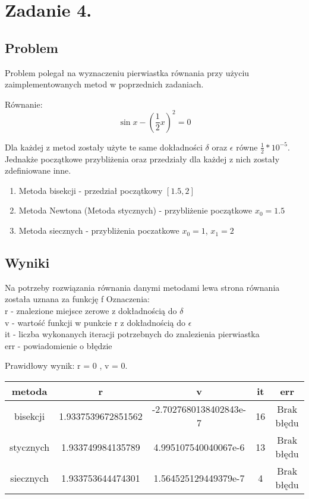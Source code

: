 \documentclass[11pt, a4paper]{article}
\begin{document}
    \section{Zadanie 4.}
    \subsection{Problem}
    Problem polegał na wyznaczeniu pierwiastka równania przy użyciu zaimplementowanych metod w poprzednich zadaniach.
    
    Równanie:
    \[\sin{x} - (\frac{1}{2}x)^{2} = 0 \]

    Dla każdej z metod zostały użyte te same dokładności $\delta$ oraz $\epsilon$ równe $\frac{1}{2} * 10^{-5}$.\\
    Jednakże początkowe przybliżenia oraz przedziały dla każdej z nich zostały zdefiniowane inne.
    \begin{enumerate}
        \item Metoda bisekcji - przedział początkowy $[1.5, 2]$
        \item Metoda Newtona (Metoda stycznych) - przybliżenie początkowe $x_{0} = 1.5$
        \item Metoda siecznych - przybliżenia poczatkowe $x_{0} = 1$, $x_{1} = 2$
    \end{enumerate}
    \subsection{Wyniki}
    Na potrzeby rozwiązania równania danymi metodami lewa strona równania została uznana za funkcję f
    Oznaczenia:\\
    r - znalezione miejsce zerowe z dokładnością do $\delta$ \\
    v - wartość funkcji w punkcie r z dokładnością do $\epsilon$ \\
    it - liczba wykonanych iteracji potrzebnych do znalezienia pierwiastka \\
    err - powiadomienie o błędzie

    Prawidłowy wynik: r = 0 , v = 0.
    \begin{center}
        \begin{tabular}{c|c|c|c|c}
            metoda & r & v & it & err\\
            \hline
            bisekcji & 1.9337539672851562 & -2.7027680138402843e-7 & 16 & Brak błędu\\
            stycznych & 1.933749984135789 & 4.995107540040067e-6 & 13 & Brak błędu\\
            siecznych & 1.933753644474301 & 1.564525129449379e-7 & 4 & Brak błędu\\
        \end{tabular}
    \end{center}
\end{document}
